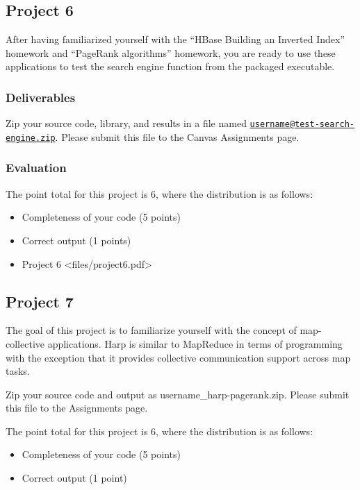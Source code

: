 \subsection{Project 6}\label{project-6}

After having familiarized yourself with the ``HBase Building an Inverted
Index'' homework and ``PageRank algorithms'' homework, you are ready to
use these applications to test the search engine function from the
packaged executable.

\subsubsection{Deliverables}\label{deliverables}

Zip your source code, library, and results in a file named
\href{mailto:username@test-search-engine.zip}{\nolinkurl{username@test-search-engine.zip}}.
Please submit this file to the Canvas Assignments page.

\subsubsection{Evaluation}\label{evaluation}

The point total for this project is 6, where the distribution is as
follows:

\begin{itemize}
\tightlist
\item
  Completeness of your code (5 points)
\item
  Correct output (1 points)
\item
  Project 6 \textless{}files/project6.pdf\textgreater{}
\end{itemize}

\subsection{Project 7}\label{project-7}

The goal of this project is to familiarize yourself with the concept of
map-collective applications. Harp is similar to MapReduce in terms of
programming with the exception that it provides collective communication
support across map tasks.

Zip your source code and output as username\_harp-pagerank.zip. Please
submit this file to the Assignments page.

The point total for this project is 6, where the distribution is as
follows:

\begin{itemize}
\tightlist
\item
  Completeness of your code (5 points)
\item
  Correct output (1 point)
\end{itemize}

